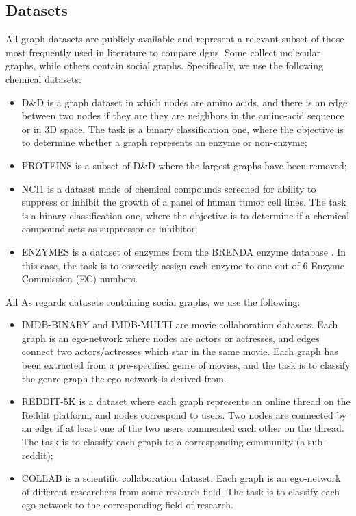 \subsection{Datasets}
All  graph  datasets  are  publicly  available \cite{?}  and  represent  a  relevant subset of those most frequently used in literature to compare \glspl{dgn}. Some collect molecular graphs, while others contain social graphs. Specifically, we use the following chemical datasets:
\begin{itemize}
    \item D\&D \cite{?} is a graph dataset in which nodes are amino acids, and there is an edge between two nodes if they are they are neighbors in the amino-acid sequence or in 3D space. The task is a binary classification one, where the objective is to determine whether a graph represents an enzyme or non-enzyme;
    \item PROTEINS \cite{?} is a subset of D\&D where the largest graphs have been removed;
    \item NCI1 \cite{?} is a dataset made of chemical compounds screened for ability to suppress or inhibit the growth of a panel of human tumor cell lines. The task is a binary classification one, where the objective is to determine if a chemical compound acts as suppressor or inhibitor;
    \item ENZYMES \cite{?} is a dataset of enzymes from the BRENDA enzyme database \cite{?}. In this case, the task is to correctly assign each enzyme to one out of 6 Enzyme Commission (EC) numbers.
\end{itemize}
All As regards datasets containing social graphs, we use the following:
\begin{itemize}
    \item IMDB-BINARY and IMDB-MULTI \cite{?} are movie collaboration datasets. Each graph is an ego-network where nodes are actors or actresses, and edges connect two actors/actresses which star in the same movie. Each graph has been extracted from a pre-specified genre of movies, and the task is to classify the genre graph the ego-network is derived from.
    \item REDDIT-5K \cite{?} is a dataset where each graph represents an online thread on the Reddit platform, and nodes correspond to users. Two nodes are connected by an edge if at least one of the two users commented each other on the thread. The task is to classify each graph to a corresponding community (a sub-reddit);
    \item COLLAB \cite{?} is a scientific collaboration dataset. Each graph is an ego-network of different researchers from some research field. The task is to classify each ego-network to the corresponding field of research.
\end{itemize}
